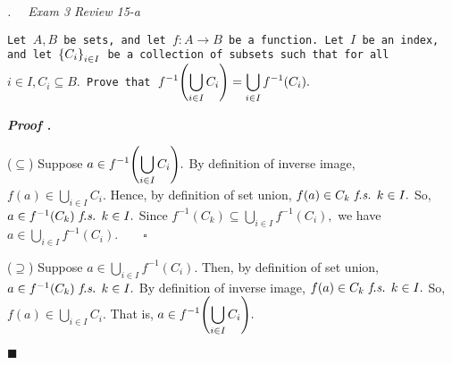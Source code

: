 \documentclass[11pt,letter]{article}
\newcounter{nq}[section]
\newcounter{np}[section]
\newenvironment*{p}{\par\noindent\textbf{\textit{Proof \stepcounter{np}\thenp. }}\par}{\par\hfill $\blacksquare$\par}
\newenvironment*{q}[1]{\noindent\emph{\thesection.\stepcounter{nq}\thenq$\quad $ #1}\par\noindent\texttt}{}
\def\fs{\emph{ f.s. }}
\def\dsst{\displaystyle}
\def\f{f^{-1}}
\begin{document}
\begin{framed}\begin{q}
	{Exam 3 Review 15-a}
	{Let $A,B$ be sets, and let $f:A\to B$ be a function. Let $I$ be an index, and let $\qty{C_i}_{i\in I}$ be a collection of subsets such that for all $i\in I,C_i\subseteq B.$ Prove that $\dsst\f\qty(\bigcup_{i\in I}C_i)=\bigcup_{i\in I}\f(C_i).$}
\end{q}\end{framed}
\begin{p}
	($\subseteq$) Suppose $a\in\dsst\f\qty(\bigcup_{i\in I}C_i).$ By definition of inverse image, $f(a)\in\dsst\bigcup_{i\in I}C_i.$ Hence, by definition of set union, $f(a)\in C_k\fs k\in I.$ So, $a\in\f(C_k)\fs k\in I.$ Since $\f(C_k)\subseteq\dsst\bigcup_{i\in I}\f(C_i),$ we have $a\in\dsst\bigcup_{i\in I}\f(C_i).\qquad\square$\par 
	($\supseteq$) Suppose $a\in\dsst\bigcup_{i\in I}\f(C_i).$ Then, by definition of set union, $a\in\f(C_k)\fs k\in I.$ By definition of inverse image, $f(a)\in C_k\fs k\in I.$ So, $f(a)\in\dsst\bigcup_{i\in I}C_i.$ That is, $a\in\dsst\f\qty(\bigcup_{i\in I}C_i).$
\end{p}

\label{LastPage}
\end{document}
